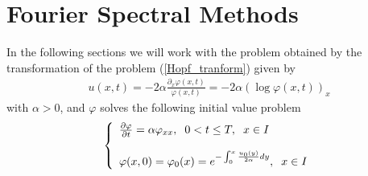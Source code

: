 \section{Fourier Spectral Methods}
	
	In the following sections we will work with the problem obtained by the transformation of the problem (\ref{Hopf_tranform}) given by
	\begin{align}
		u(x, t) = - 2 \alpha \frac{\partial_{x} \varphi(x, t)}{\varphi(x, t)} = - 2 \alpha \left( \log{\varphi(x, t)} \right)_x
	\end{align}
	with $\alpha > 0$, and $\varphi$ solves the following initial value problem
	\begin{align}
	\label{Bugers_Lineal}	
		\left \lbrace \begin{array}{ll}
			\frac{\partial \varphi}{\partial t} = \alpha \varphi_{xx}, \hspace{2mm} 0 < t \leq T, \hspace{2mm} x \in I \\
			\\
			\varphi(x, 0) = \displaystyle \varphi_0 (x) = e^{- \int_{0}^{x} \frac{u_0(y)}{2 \alpha} dy}, \hspace{2mm} x \in I
		\end{array}  \right .
	\end{align}
	
	